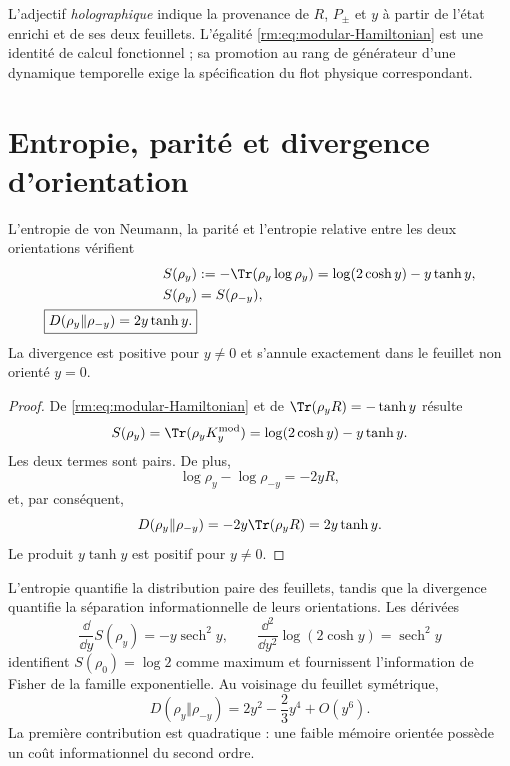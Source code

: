 L’adjectif \emph{holographique} indique la provenance de \(R\), \(P_\pm\) et \(y\) à partir de l’état enrichi et de ses deux feuillets. L’égalité \cref{rm:eq:modular-Hamiltonian} est une identité de calcul fonctionnel ; sa promotion au rang de générateur d’une dynamique temporelle exige la spécification du flot physique correspondant.

\section{Entropie, parité et divergence d’orientation}

\begin{theorem}
\label{rm:thm:modular-information-geometry} L’entropie de von Neumann, la parité et l’entropie relative entre les deux orientations vérifient
\begin{align}
 S(\rho_y)
 &:=-\Tr(\rho_y\log\rho_y)
 =\log(2\cosh y)-y\tanh y,
 \label{rm:eq:modular-entropy}\\
 S(\rho_y)&=S(\rho_{-y}),
 \label{rm:eq:modular-entropy-even}\\
 \boxed{
 D(\rho_y\Vert\rho_{-y})
 =2y\tanh y.}
 \label{rm:eq:modular-relative-entropy}
\end{align}
La divergence est positive pour \(y\ne0\) et s’annule exactement dans le feuillet non orienté \(y=0\).
\end{theorem}

\begin{proof}
De \cref{rm:eq:modular-Hamiltonian} et de \(\Tr(\rho_yR)=-\tanh y\) résulte
\[
 S(\rho_y)=\Tr(\rho_yK_y^{\rm mod})
 =\log(2\cosh y)-y\tanh y.
\]
Les deux termes sont pairs. De plus,
\[
 \log\rho_y-\log\rho_{-y}=-2yR,
\]
et, par conséquent,
\[
 D(\rho_y\Vert\rho_{-y})
 =-2y\Tr(\rho_yR)=2y\tanh y.
\]
Le produit \(y\tanh y\) est positif pour \(y\ne0\).
\end{proof}

L’entropie quantifie la distribution paire des feuillets, tandis que la divergence quantifie la séparation informationnelle de leurs orientations. Les dérivées
\begin{equation}
 \frac{\dd}{\dd y}S(\rho_y)=-y\operatorname{sech}^2y,
 \qquad
 \frac{\dd^2}{\dd y^2}\log(2\cosh y)
 =\operatorname{sech}^2y
 \label{rm:eq:modular-entropy-derivatives}
\end{equation}
identifient \(S(\rho_0)=\log2\) comme maximum et fournissent l’information de Fisher de la famille exponentielle. Au voisinage du feuillet symétrique,
\begin{equation}
 D(\rho_y\Vert\rho_{-y})
 =2y^2-\frac23y^4+O(y^6).
 \label{rm:eq:modular-relative-expansion}
\end{equation}
La première contribution est quadratique : une faible mémoire orientée possède un coût informationnel du second ordre.

